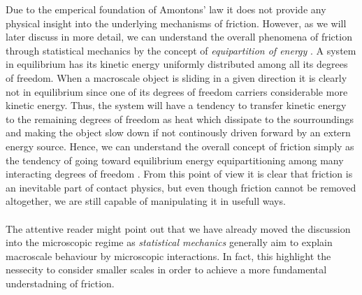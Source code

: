 Due to the emperical foundation of Amontons’ law it does not provide any
physical insight into the underlying mechanisms of friction. However, as we will
later discuss in more detail, we can understand the overall phenomena of
friction through statistical mechanics by the concept of \textit{equipartition
of energy} \cite{Manini_2016}. A system in equilibrium has its kinetic energy
uniformly distributed among all its degrees of freedom. When a macroscale object
is sliding in a given direction it is clearly not in equilibrium since one of
its degrees of freedom carriers considerable more kinetic energy. Thus, the
system will have a tendency to transfer kinetic energy to the remaining
degrees of freedom as heat which dissipate to the sourroundings and making the object slow down if not continously driven forward by an extern energy source.  Hence, we can understand the overall concept of friction simply
as the tendency of going toward equilibrium energy equipartitioning among many
interacting degrees of freedom \cite{Manini_2016}. From this point of view it is
clear that friction is an inevitable part of contact physics, but even though
friction cannot be removed altogether, we are still capable of manipulating it
in usefull ways. \\
\\
The attentive reader might point out that we have already moved the discussion
into the microscopic regime as \textit{statistical mechanics} generally
aim to explain macroscale behaviour by microscopic interactions. In fact, this 
highlight the nessecity to consider smaller scales in order to achieve a more fundamental understadning of friction.








